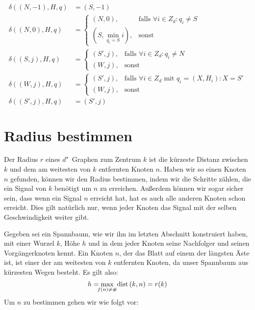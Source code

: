 \documentclass[11pt]{article}
\begin{document}
\begin{align*}
	\delta((N, -1), H, q) &= (S, -1) \\
	\delta((N, 0), H, q) &= \begin{cases}
							(N, 0), &\text{falls }\forall i \in Z_d : q_i \neq S \\
							(S, \min_{q_i = S} i), &\text{sonst}
						\end{cases} \\
	\delta((S, j), H, q) &= \begin{cases}
							(S', j), &\text{falls } \forall i \in Z_d : q_i \neq N \\
							(W, j),  & \text{sonst} 
						\end{cases} \\
	\delta((W, j), H, q) &= \begin{cases}
							(S', j), & \text{falls }\forall i \in Z_d \text{ mit } q_i = (X, H_i) : X = S' \\
							(W, j),  & \text{sonst} 
						\end{cases} \\
	\delta((S', j), H, q) &= (S', j)
\end{align*}

\section{Radius bestimmen}
Der Radius $r$ eines $d$"~Graphen zum Zentrum $k$ ist die kürzeste Distanz zwischen $k$ und dem am weitesten von $k$ entfernten Knoten $n$. 
Haben wir so einen Knoten $n$ gefunden, können wir den Radius bestimmen, indem wir die Schritte zählen, die ein Signal von $k$ benötigt um $n$ zu erreichen. 
Außerdem können wir sogar sicher sein, dass wenn ein Signal $n$ erreicht hat, hat es auch alle anderen Knoten schon erreicht. 
Dies gilt natürlich nur, wenn jeder Knoten das Signal mit der selben Geschwindigkeit weiter gibt.

Gegeben sei ein Spannbaum, wie wir ihn im letzten Abschnitt konstruiert haben, mit einer Wurzel $k$, Höhe $h$ und in dem jeder Knoten seine Nachfolger und seinen Vorgängerknoten kennt. 
Ein Knoten $n$, der das Blatt auf einem der längsten Äste ist, ist einer der am weitesten von $k$ entfernten Knoten, da unser Spannbaum aus kürzesten Wegen besteht. 
Es gilt also:
\begin{displaymath}
h = \max_{\mathclap{f\left(n\right) \neq \#}} \text{ dist}\left(k, n\right) = r(k)
\end{displaymath}
Um $n$ zu bestimmen gehen wir wie folgt vor:
\end{document}
